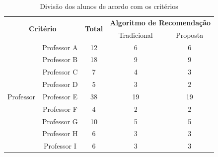 \begin{table}[ht]
\footnotesize
\caption[Divisão dos alunos de acordo com os critérios]{Divisão dos alunos de acordo com os critérios}
\label{tab:divisao-alunos-experimento}
\centering
\begin{tabular}{ccccc}
  \hline
  \multicolumn{2}{c}{\multirow{2}{*}{\textbf{Critério}}}           & \multirow{2}{*}{\textbf{Total}}           & \multicolumn{2}{c}{\textbf{Algoritmo de Recomendação}} \\
                                        &                          &                                           & Tradicional          & Proposta                        \\
  \hline
  \multirow{12}{*}{Professor}           & Professor A              & 12                                        & 6                    & 6                               \\
                                        & Professor B              & 18                                        & 9                    & 9                               \\
                                        & Professor C              & 7                                         & 4                    & 3                               \\
                                        & Professor D              & 5                                         & 3                    & 2                               \\
                                        & Professor E              & 38                                        & 19                   & 19                              \\
                                        & Professor F              & 4                                         & 2                    & 2                               \\
                                        & Professor G              & 10                                        & 5                    & 5                               \\
                                        & Professor H              & 6                                         & 3                    & 3                               \\
                                        & Professor I              & 6                                         & 3                    & 3                               \\

\end{tabular}
\end{table}
